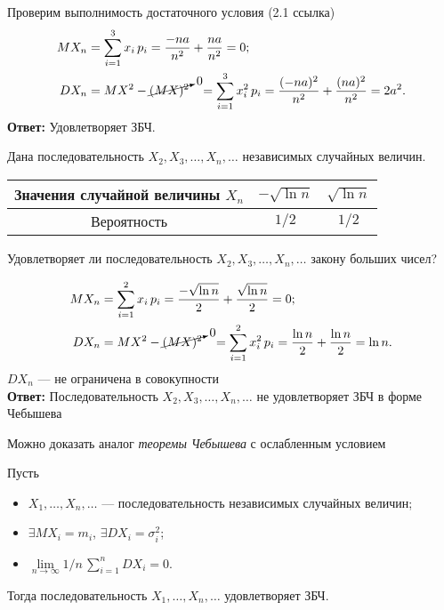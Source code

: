 \begin{slv}
	Проверим выполнимость достаточного условия (2.1 ссылка)
	\begin{align*}
		MX_n &= \sum_{i = 1}^{3} x_i\,p_i = \frac{-na}{n^2} + \frac{na}{n^2} = 0;  \\
		DX_n &= MX^2 - \cancelto{0}{(MX)^2}\;\;\; = \sum_{i = 1}^{3} x_i^2\, p_i = \frac{(-na)^2}{n^2} + \frac{(na)^2}{n^2} = 2a^2.
	\end{align*}
	\textbf{Ответ:} Удовлетворяет ЗБЧ.
\end{slv}

\begin{exm}
	Дана последовательность $X_2, X_3, \dots, X_n, \dots$ независимых случайных величин. 
	\begin{center}\begin{tabular}{|| c || c | c |}
		\hline
		Значения случайной величины $X_n$ & $-\sqrt{\ln n}$ & $\sqrt{\ln n}$ \\
		\hline
		Вероятность & $1/2$ & $1/2$ \\
		\hline
	\end{tabular}\end{center}
	Удовлетворяет ли последовательность $X_2, X_3, \dots, X_n, \dots$ закону больших чисел?
\end{exm}

\begin{slv}
	\begin{align*}
		MX_n &= \sum_{i = 1}^{2} x_i\, p_i = \frac{-\sqrt{\ln n}}{2} + \frac{\sqrt{\ln n}}{2} = 0; \\
		DX_n &= MX^2 - \cancelto{0}{(MX)^2}\;\;\; = \sum_{i = 1}^{2} x_i^2\, p_i = \frac{\ln n}{2} + \frac{\ln n}{2} = \ln n.
	\end{align*}
	$DX_n$ --- не ограничена в совокупности\\
	\textbf{Ответ:} Последовательность $X_2, X_3, \dots, X_n, \dots $ не удовлетворяет ЗБЧ в форме Чебышева
\end{slv}

\begin{rem}
	Можно доказать аналог \textit{теоремы Чебышева} с ослабленным условием
\end{rem}

\begin{thm}  Пусть
	\begin{itemize}
		\item $X_1, \dots, X_n, \dots$ --- последовательность независимых случайных величин;
		\item $\exists MX_i = m_i$, $\exists DX_i = \sigma_i^2$;
		\item $\lim\limits_{n \to \infty} 1/n \, \sum_{i = 1}^{n} DX_i = 0$.
	\end{itemize}
	Тогда последовательность $X_1, \dots, X_n, \dots$ удовлетворяет ЗБЧ.
\end{thm}

